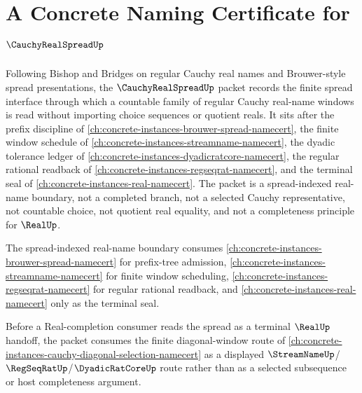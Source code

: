 \chapter{A Concrete Naming Certificate for $\CauchyRealSpreadUp$}
\label{ch:concrete-instances-cauchy-real-spread-namecert}

Following Bishop and Bridges on regular Cauchy real names and Brouwer-style spread presentations, the $\CauchyRealSpreadUp$ packet records the finite spread interface through which a countable family of regular Cauchy real-name windows is read without importing choice sequences or quotient reals. It sits after the prefix discipline of \autoref{ch:concrete-instances-brouwer-spread-namecert}, the finite window schedule of \autoref{ch:concrete-instances-streamname-namecert}, the dyadic tolerance ledger of \autoref{ch:concrete-instances-dyadicratcore-namecert}, the regular rational readback of \autoref{ch:concrete-instances-regseqrat-namecert}, and the terminal seal of \autoref{ch:concrete-instances-real-namecert}. The packet is a spread-indexed real-name boundary, not a completed branch, not a selected Cauchy representative, not countable choice, not quotient real equality, and not a completeness principle for $\RealUp$.

The spread-indexed real-name boundary consumes \autoref{ch:concrete-instances-brouwer-spread-namecert} for prefix-tree admission, \autoref{ch:concrete-instances-streamname-namecert} for finite window scheduling, \autoref{ch:concrete-instances-regseqrat-namecert} for regular rational readback, and \autoref{ch:concrete-instances-real-namecert} only as the terminal seal.

Before a Real-completion consumer reads the spread as a terminal $\RealUp$ handoff, the packet consumes the finite diagonal-window route of \autoref{ch:concrete-instances-cauchy-diagonal-selection-namecert} as a displayed $\StreamNameUp$/$\RegSeqRatUp$/$\DyadicRatCoreUp$ route rather than as a selected subsequence or host completeness argument.

